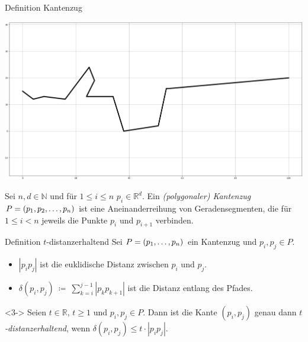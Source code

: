 \documentclass{beamer}
\begin{document}
	\begin{frame}{Definition Kantenzug}

		\centering
		\includegraphics[height=0.6\textheight]{raw_path.png}
		
		\begin{definition}
			Sei $n, d \in \mathbb{N}$ und für $1 \leq i \leq n$ $p_i \in \mathbb{R}^d$.
			Ein \emph{(polygonaler) Kantenzug} $P = (p_1, p_2, \mathellipsis, p_n)$ ist eine Aneinanderreihung von Geradensegmenten, die für $1 \leq i < n$ jeweils die Punkte $p_i$ und $p_{i+1}$ verbinden. 

		\end{definition}
	\end{frame}
	
	\begin{frame}{Definition $t$-distanzerhaltend}
		Sei $P = (p_1, \mathellipsis, p_n)$ ein Kantenzug und $p_i, p_j \in P$.
		\begin{itemize}
			\item<1-> $|p_ip_j|$ ist die euklidische Distanz zwischen $p_i$ und $p_j$.
			\item<2->$\delta(p_i, p_j)~\coloneqq~\sum\limits_{k=i}^{j-1}{|p_kp_{k+1}|}$ ist die Distanz entlang des Pfades.
		\end{itemize}
		\begin{definition}<3->
			Seien $t \in \mathbb{R}$, $t \geq 1$ und $p_i, p_j \in P$. 
			Dann ist die Kante $(p_i, p_j)$ genau dann \emph{$t$-distanzerhaltend}, wenn $\delta(p_i, p_j) \leq t \cdot |p_ip_j|$.
		\end{definition}
		
	\end{frame}
	
\end{document}
